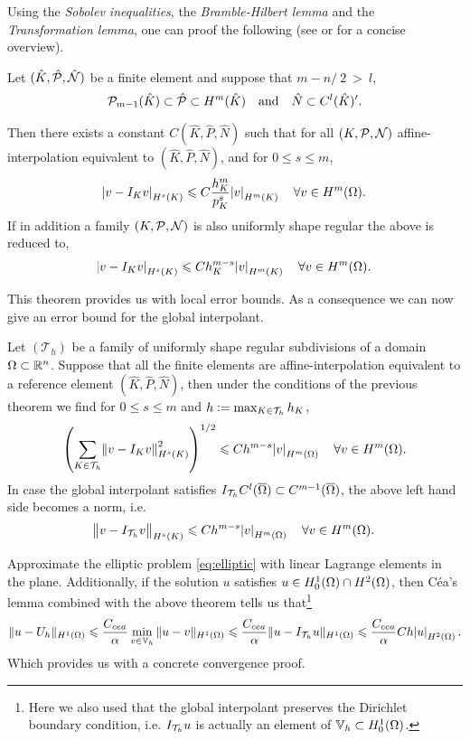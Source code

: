 \documentclass[thesis.tex]{subfiles}
\begin{document}
  Using the \emph{Sobolev inequalities}, the \emph{Bramble-Hilbert lemma} and the \emph{Transformation lemma}, one
  can proof the following (see \cite[Ch~3]{chen} or \cite{stevenson} for a concise overview).
  \begin{thm}
    Let $(\hat K, \hat \P, \hat \N)$ be a finite element and suppose that $m - n/~2~>~l$,
    \[
      \P_{m-1}(\hat K) \subset \hat \P \subset H^m(\hat K) \quad \text{and} \quad \hat N \subset  C^l(\hat K)'.
    \]
    
    Then there exists a constant $C(\hat K, \hat P, \hat N)$ such that for all $(K, \P, \N)$ affine-interpolation
      equivalent to $(\hat K, \hat P, \hat N)$, and for $0 \leq s \leq m$,
      \[
        \abs{v - I_K v}_{H^s(K)} \leq C \frac{h_K^{m}}{p_K^s} \abs{v}_{H^m(K)} \quad  \forall v \in H^m(\O).
      \]
      If in addition a family $(K, \P, \N)$ is also uniformly shape regular the above is reduced to,
      \[
        \abs{v - I_K v}_{H^s(K)} \leq C h_K^{m -s} \abs{v}_{H^m(K)} \quad \forall v \in H^m(\O).
      \]
  \end{thm}
  This theorem provides us with local error bounds. As a consequence we can now
  give an error bound for the global interpolant.
  \begin{thm}
    Let $(\mathcal{T}_h)$ be a family of uniformly shape regular subdivisions of a domain~$\O \subset \R^n$.
    Suppose that all the finite elements are affine-interpolation equivalent to a reference element $(\hat K, \hat P, \hat N)$,
    then under the conditions of the previous theorem we find for $0 \leq s \leq m$ and $h  := \max_{ K \in \T_h} h_K$,
    \[
      \left( \sum_{K \in \T_h} \norm{v - I_K v}^2_{H^s(K)}\right)^{1/2} \leq C h^{m-s} \abs{v}_{H^m(\O)} \quad \forall v \in H^m(\Omega).
    \]
    In case the global interpolant satisfies $I_{\T_h} C^l(\OO) \subset C^{m-1}(\OO)$, the above left hand side becomes a norm, i.e. 
    \[
      \norm{v - I_{\T_h}v}_{H^s(K)} \leq C h^{m-s} \abs{v}_{H^m(\O)} \quad \forall v \in H^m(\Omega).
    \]
  \end{thm}
  Approximate the elliptic problem \eqref{eq:elliptic} with linear Lagrange elements in the plane. Additionally, if
  the solution $u$ satisfies $u \in H_0^1(\O)\cap H^2(\O)$, then C\'ea's lemma combined with the above theorem tells us that\footnote{
  Here we also used that the global interpolant preserves the Dirichlet boundary condition, i.e.
   $I_{\T_h} u$ is actually an element of $\VV_h \subset H_0^1(\O)$.}
  \begin{equation}
    \label{eq:conv_h}
    \|u - U_h\|_{H^1(\O)} \leq \frac{C_{cea}}{\alpha} \min_{v \in \VV_h} \| u - v\|_{H^1(\O)} \leq \frac{C_{cea}}{\alpha} \| u - I_{\T_h}u \|_{H^1(\O)} \leq \frac{C_{cea}}{\alpha} C  h \abs{u}_{H^2(\O)}.
  \end{equation}
  Which provides us with a concrete convergence proof. 
\end{document}
